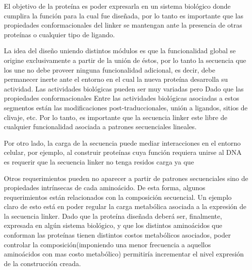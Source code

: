 El objetivo de la proteína es poder expresarla en un sistema biológico donde cumplira la función para la cual fue diseñada, por lo tanto es importante que las
propiedades conformacionales del linker se mantengan ante la presencia de otras proteínas o cualquier tipo de ligando.




La idea del diseño uniendo distintos módulos es que la funcionalidad global se origine exclusivamente a partir de la unión de éstos, por lo tanto la secuencia que los une no debe proveer ninguna funcionalidad adicional, es decir,
debe permanecer inerte ante el entorno en el cual la nueva proteína desarrolla su actividad. 
Las actividades biológicas pueden ser muy variadas pero   
Dado que las propiedades conformacionales  
Entre las actividades biológicas asociadas a estos segmentos están las modificaciones post-traduccionales, unión a ligandos, sitios de clivaje, etc.
Por lo tanto, es importante que la secuencia linker este libre de cualquier funcionalidad asociada a patrones secuenciales lineales. 






% 
% 





Por otro lado, la carga de la secuencia puede mediar interacciones en el entorno celular, por ejemplo, al construir proteínas cuya función requiera unirse al DNA es 
requerir que la secuencia linker no tenga residos carga ya que 

Otros requerimientos pueden no aparecer a partir de patrones secuenciales sino de propiedades intrínsecas de cada aminoácido. 
De esta forma, algunos requerimientos están relacionados con la composición secuencial. 
Un ejemplo claro de esto está en poder regular la carga metabólica asociada a la expresión de la secuencia linker. 
Dado que la proteína diseñada deberá ser, finalmente, expresada en algún sistema biológico, y que los distintos aminoácidos que conforman las proteínas tienen distintos costos metabólicos asociados, 
poder controlar la composición(imponiendo una menor frecuencia a aquellos aminoácidos con mas costo metabólico) permitiría incrementar el nivel expresión de la construcción creada.

